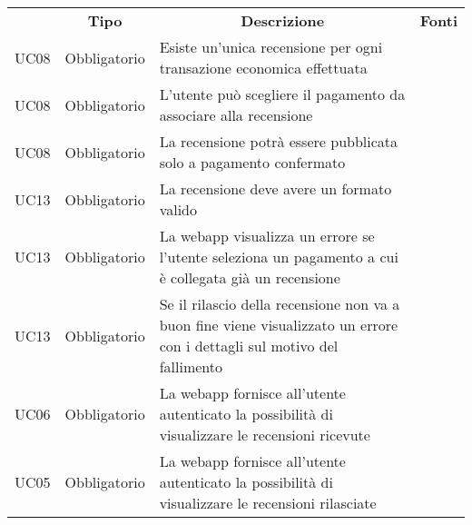 \begin{table}[H]
    \centering
    \renewcommand{\arraystretch}{1.8}
        \begin{tabular}{c | c | p{6cm} | c }
            \rowcolor[HTML]{a52a2a}
            \multicolumn{1}{c}{\color[HTML]{FFFFFF} \textbf{Codice}}          &
            \multicolumn{1}{c}{\color[HTML]{FFFFFF} \textbf{Tipo}} &
            \multicolumn{1}{c}{\color[HTML]{FFFFFF} \textbf{Descrizione}}     &
            \multicolumn{1}{c}{\color[HTML]{FFFFFF} \textbf{Fonti}}                                                                                                                                                                   
            \\       

    UC08& Obbligatorio &       Esiste un'unica recensione per ogni transazione economica effettuata                  & \Shortunderstack{\ref{UC08}}                        \\
    UC08& Obbligatorio &    	L'utente può scegliere il pagamento da associare alla recensione& \Shortunderstack{\ref{UC08}}                        \\
    UC08& Obbligatorio &    	La recensione potrà essere pubblicata solo a pagamento confermato        & \Shortunderstack{\ref{UC08}}   \\
    UC13& Obbligatorio &    	La recensione deve avere un formato valido     & \Shortunderstack{\ref{UC13}}   \\
    UC13& Obbligatorio &    	La webapp visualizza un errore se l'utente seleziona un pagamento a cui è collegata già un recensione& \Shortunderstack{\ref{UC13}}                        \\
    UC13& Obbligatorio &    	Se il rilascio della recensione non va a buon fine viene visualizzato un errore con  i dettagli sul motivo del fallimento   & \Shortunderstack{\ref{UC13}}   \\
    UC06& Obbligatorio &    	La webapp fornisce all'utente autenticato la possibilità di visualizzare le recensioni ricevute& \Shortunderstack{\ref{UC06}} \\
    UC05& Obbligatorio &    	La webapp fornisce all'utente autenticato la possibilità di visualizzare le recensioni rilasciate& \Shortunderstack{\ref{UC05}} \\    
        \end{tabular}
    \end{table}


